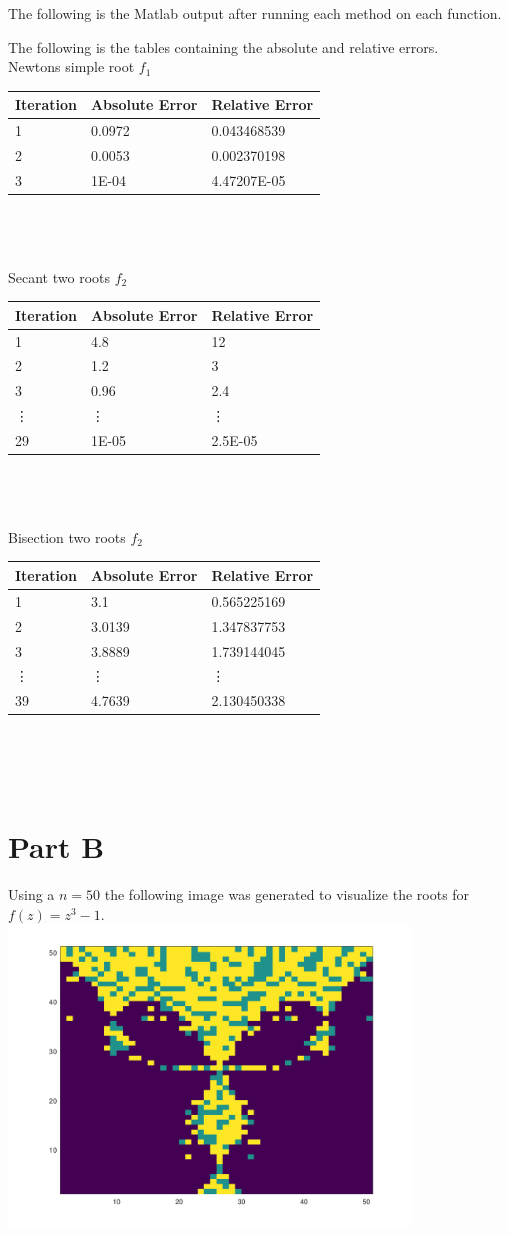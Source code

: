 \documentclass{article}
\begin{document}
The following is the Matlab output after running each method on each function. 


The following is the tables containing the absolute and relative errors. \\

Newtons simple root $f_1$ \\
\begin{tabular}{ l | l | l }
	Iteration & Absolute Error & Relative Error  \\
	\hline
	1 & 0.0972 & 0.043468539 \\
	2 & 0.0053 & 0.002370198 \\
	3 & 1E-04 & 4.47207E-05 \\
\end{tabular}\\\\\\

Secant two roots $f_2$ \\
\begin{tabular}{ l | l | l }
	Iteration & Absolute Error & Relative Error  \\
	\hline
	1 & 4.8 & 12 \\
	2 & 1.2 & 3 \\
	3 & 0.96 & 2.4 \\
 	\vdots &  \vdots & \vdots  \\
	29 & 1E-05 & 2.5E-05 \\
\end{tabular}\\\\\\

Bisection two roots $f_2$ \\
\begin{tabular}{ l | l | l }
	Iteration & Absolute Error & Relative Error  \\
	\hline
	1 & 3.1	& 0.565225169 \\
	2 & 3.0139 & 1.347837753 \\
	3 & 3.8889 & 1.739144045 \\
 	\vdots &  \vdots & \vdots  \\
	39 & 4.7639 & 2.130450338 \\
\end{tabular}\\\\\\

\section*{Part B}
Using a $n=50$ the following image was generated to visualize the roots for $f(z) = z^3 - 1$. \\

\includegraphics[height=8cm]{problem2.png}
\end{document}
